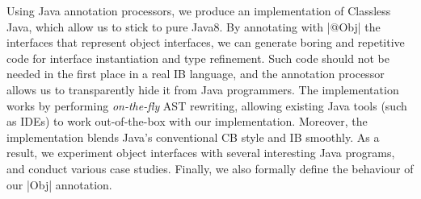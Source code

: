 Using Java annotation processors, we produce an implementation of
Classless Java, which allow us to stick to pure Java8. By annotating
with \Q|@Obj| the interfaces that represent object interfaces, we can
generate boring and repetitive code for interface instantiation and
type refinement. Such code should not be needed in the first place in
a real IB language, and the annotation processor allows us to
transparently hide it from Java programmers. 
The implementation works by performing \emph{on-the-fly} AST
rewriting, allowing existing Java tools (such as IDEs) to work
out-of-the-box with our implementation. Moreover, the 
implementation blends Java's conventional CB style and IB smoothly. 
As a result, we experiment object interfaces with several interesting Java programs,
and conduct various case studies. 
Finally, we also formally define the behaviour of our \Q|Obj| annotation. 





%




